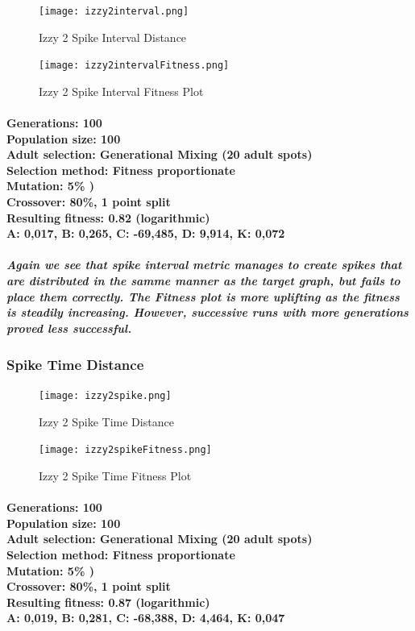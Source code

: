 \documentclass[titlepage,norsk]{article}
\begin{document}
\begin{figure}[h!]
\centering
\texttt{[image: izzy2interval.png]}
\caption{Izzy 2 Spike Interval Distance}
\label{fig:awesome_image}
\end{figure}

\begin{figure}[h!]
\centering
\texttt{[image: izzy2intervalFitness.png]}
\caption{Izzy 2 Spike Interval Fitness Plot}
\label{fig:awesome_image}
\end{figure}

\paragraph{
Generations: 100\\
Population size: 100\\
Adult selection: Generational Mixing (20 adult spots) \\
Selection method: Fitness proportionate\\
Mutation:  5\% )\\
Crossover: 80\%, 1 point split \\
Resulting fitness: 0.82 (logarithmic) \\
A: 0,017, B: 0,265, C: -69,485, D: 9,914, K: 0,072 \\
}

\subparagraph{Again we see that spike interval metric manages to create spikes that are distributed in the samme manner as the target graph, but fails to place them correctly. The Fitness plot is more uplifting as the fitness is steadily increasing. However, successive runs with more generations proved less successful.}

\subsubsection{Spike Time  Distance}

\begin{figure}[h!]
\centering
\texttt{[image: izzy2spike.png]}
\caption{Izzy 2 Spike Time Distance}
\label{fig:awesome_image}
\end{figure}

\begin{figure}[h!]
\centering
\texttt{[image: izzy2spikeFitness.png]}
\caption{Izzy 2 Spike Time Fitness Plot}
\label{fig:awesome_image}
\end{figure}

\paragraph{
Generations: 100\\
Population size: 100\\
Adult selection: Generational Mixing (20 adult spots) \\
Selection method: Fitness proportionate\\
Mutation:  5\% )\\
Crossover: 80\%, 1 point split \\
Resulting fitness: 0.87 (logarithmic) \\
A: 0,019, B: 0,281, C: -68,388, D: 4,464, K: 0,047  \\
}
\end{document}
